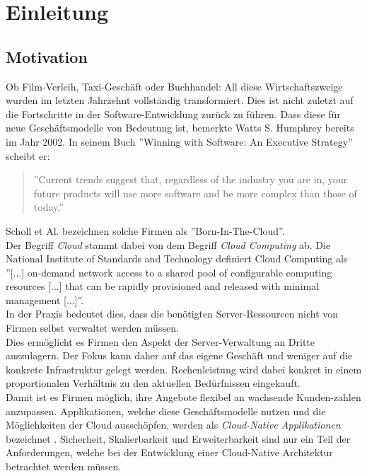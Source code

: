 \chapter{Einleitung}

\section{Motivation}
Ob Film-Verleih, Taxi-Geschäft oder Buchhandel: All diese Wirtschaftszweige wurden im letzten Jahrzehnt vollständig transformiert. Dies ist nicht zuletzt auf die Fortschritte in der Software-Entwicklung zurück zu führen. Dass diese für neue Geschäftsmodelle von Bedeutung ist, bemerkte Watts S. Humphrey bereits im Jahr 2002. In seinem Buch ''Winning with Software: An Executive Strategy'' scheibt er: 
\begin{quote}
''Current trends suggest that, regardless of the industry you are in, your future products will use more software and be more complex than those of today.'' \cite{humphrey_why_2002}
\end{quote}
Scholl et Al. bezeichnen solche Firmen als ''Born-In-The-Cloud''\cite{scholl_cloud_2019}.\\
Der Begriff \textit{Cloud} stammt dabei von dem Begriff \textit{Cloud Computing} ab. Die National Institute of Standards and Technology definiert Cloud Computing als ''[...] on-demand network access to a shared pool of configurable computing resources [...] that can be rapidly provisioned and released with minimal management [...]''\cite{mell_nist_2011}.\\
In der Praxis bedeutet dies, dass die benötigten Server-Ressourcen nicht von Firmen selbst verwaltet werden müssen. \\
Dies ermöglicht es Firmen den Aspekt der Server-Verwaltung an Dritte auszulagern. Der Fokus kann daher auf das eigene Geschäft und weniger auf die konkrete Infrastruktur gelegt werden. Rechenleistung wird dabei konkret in einem proportionalen Verhältnis zu den aktuellen Bedürfnissen eingekauft.\\
Damit ist es Firmen möglich, ihre Angebote flexibel an wachsende Kunden-zahlen anzupassen. Applikationen, welche diese Geschäftsmodelle nutzen und die Möglichkeiten der Cloud ausschöpfen, werden als \textit{Cloud-Native Applikationen} bezeichnet \cite{scholl_cloud_2019}.  Sicherheit, Skalierbarkeit und Erweiterbarkeit sind nur ein Teil der Anforderungen, welche bei der Entwicklung einer Cloud-Native Architektur betrachtet werden müssen. 

